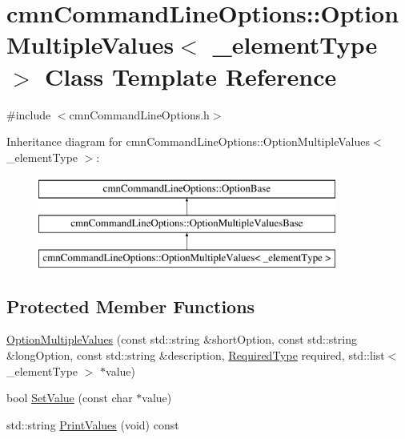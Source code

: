 \hypertarget{classcmn_command_line_options_1_1_option_multiple_values}{\section{cmn\-Command\-Line\-Options\-:\-:Option\-Multiple\-Values$<$ \-\_\-element\-Type $>$ Class Template Reference}
\label{classcmn_command_line_options_1_1_option_multiple_values}
}


{\ttfamily \#include $<$cmn\-Command\-Line\-Options.\-h$>$}

Inheritance diagram for cmn\-Command\-Line\-Options\-:\-:Option\-Multiple\-Values$<$ \-\_\-element\-Type $>$\-:\begin{figure}[H]
\begin{center}
\leavevmode
\includegraphics[height=3.000000cm]{d6/deb/classcmn_command_line_options_1_1_option_multiple_values}
\end{center}
\end{figure}
\subsection*{Protected Member Functions}
\begin{DoxyCompactItemize}
\item 
\hyperlink{classcmn_command_line_options_1_1_option_multiple_values_ad084b5b69457ae2be02ea8dd60de4acd}{Option\-Multiple\-Values} (const std\-::string \&short\-Option, const std\-::string \&long\-Option, const std\-::string \&description, \hyperlink{classcmn_command_line_options_ac239a3ca62dd4e3b391824f6f1a97c76}{Required\-Type} required, std\-::list$<$ \-\_\-element\-Type $>$ $\ast$value)
\item 
bool \hyperlink{classcmn_command_line_options_1_1_option_multiple_values_aeae0f5051c46d779f38a026753a7e5d0}{Set\-Value} (const char $\ast$value)
\item 
std\-::string \hyperlink{classcmn_command_line_options_1_1_option_multiple_values_abcb492c87a3ad314522c9d3e5b86d7ae}{Print\-Values} (void) const 
\end{DoxyCompactItemize}
